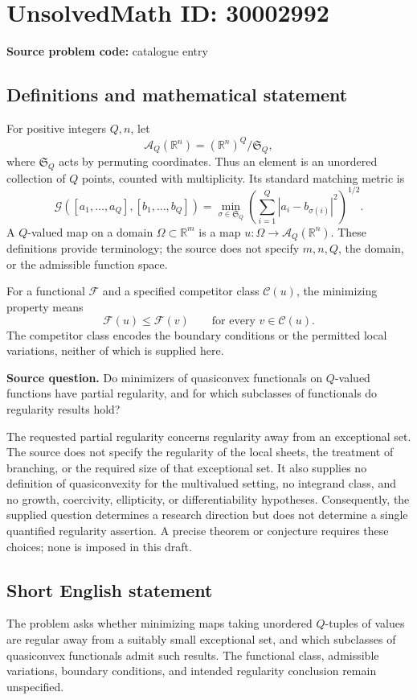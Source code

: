 \documentclass[11pt]{article}
\newcommand{\R}{\mathbb{R}}
\begin{document}
\section*{UnsolvedMath ID: 30002992}
\textbf{Source problem code:} catalogue entry
\subsection{Definitions and mathematical statement}
For positive integers \(Q,n\), let
\[
\mathcal A_Q(\R^n)=(\R^n)^Q/\mathfrak S_Q,
\]
where \(\mathfrak S_Q\) acts by permuting coordinates. Thus an element is an unordered collection of \(Q\) points, counted with multiplicity. Its standard matching metric is
\[
\mathcal G([a_1,\ldots,a_Q],[b_1,\ldots,b_Q])
=\min_{\sigma\in\mathfrak S_Q}
\left(\sum_{i=1}^Q |a_i-b_{\sigma(i)}|^2\right)^{1/2}.
\]
A \(Q\)-valued map on a domain \(\Omega\subset\R^m\) is a map \(u:\Omega\to\mathcal A_Q(\R^n)\). These definitions provide terminology; the source does not specify \(m,n,Q\), the domain, or the admissible function space.

For a functional \(\mathcal F\) and a specified competitor class \(\mathcal C(u)\), the minimizing property means
\[
\mathcal F(u)\leq\mathcal F(v)
\qquad\text{for every }v\in\mathcal C(u).
\]
The competitor class encodes the boundary conditions or the permitted local variations, neither of which is supplied here.

\textbf{Source question.} Do minimizers of quasiconvex functionals on \(Q\)-valued functions have partial regularity, and for which subclasses of functionals do regularity results hold?

The requested partial regularity concerns regularity away from an exceptional set. The source does not specify the regularity of the local sheets, the treatment of branching, or the required size of that exceptional set. It also supplies no definition of quasiconvexity for the multivalued setting, no integrand class, and no growth, coercivity, ellipticity, or differentiability hypotheses. Consequently, the supplied question determines a research direction but does not determine a single quantified regularity assertion. A precise theorem or conjecture requires these choices; none is imposed in this draft.
\subsection{Short English statement}
The problem asks whether minimizing maps taking unordered \(Q\)-tuples of values are regular away from a suitably small exceptional set, and which subclasses of quasiconvex functionals admit such results. The functional class, admissible variations, boundary conditions, and intended regularity conclusion remain unspecified.
\end{document}
